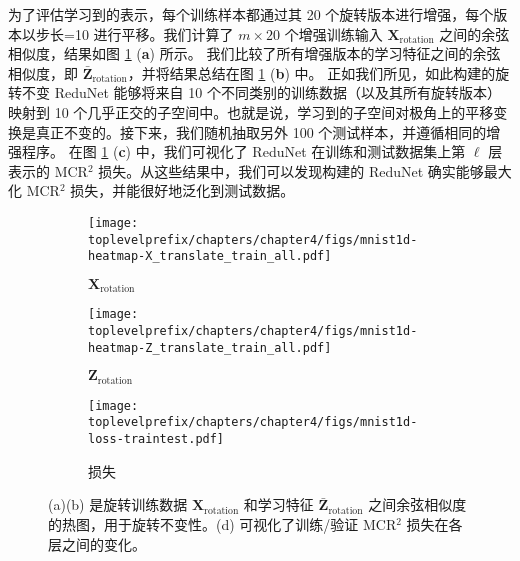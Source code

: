 \documentclass[../../book-main.tex]{subfiles}
\begin{document}
\begin{example}[数字的不变分类]
为了评估学习到的表示，每个训练样本都通过其 20 个旋转版本进行增强，每个版本以步长=10 进行平移。我们计算了 $m \times 20$ 个增强训练输入 $\bm{X}_{\text{rotation}}$ 之间的余弦相似度，结果如图 \ref{fig:redu-invariant-1d-mnist-diagram} (\textbf{a}) 所示。
我们比较了所有增强版本的学习特征之间的余弦相似度，即 $\bar{\bm{Z}}_{\text{rotation}}$，并将结果总结在图 \ref{fig:redu-invariant-1d-mnist-diagram} (\textbf{b}) 中。
正如我们所见，如此构建的旋转不变 ReduNet 能够将来自 10 个不同类别的训练数据（以及其所有旋转版本）映射到 10 个几乎正交的子空间中。也就是说，学习到的子空间对极角上的平移变换是真正不变的。接下来，我们随机抽取另外 100 个测试样本，并遵循相同的增强程序。
在图 \ref{fig:redu-invariant-1d-mnist-diagram} (\textbf{c}) 中，我们可视化了 ReduNet 在训练和测试数据集上第 $\ell$ 层表示的 MCR$^{2}$ 损失。从这些结果中，我们可以发现构建的 ReduNet 确实能够最大化 MCR$^{2}$ 损失，并能很好地泛化到测试数据。



\begin{figure}[t]
    \begin{subfigure}[t]{0.3\textwidth}
        \centering
        \texttt{[image: \\toplevelprefix/chapters/chapter4/figs/mnist1d-heatmap-X\_translate\_train\_all.pdf]}
        \caption{$\bm{X}_{\text{rotation}}$}
    \end{subfigure}
    \hfill
    \begin{subfigure}[t]{0.3\textwidth}
        \centering
        \texttt{[image: \\toplevelprefix/chapters/chapter4/figs/mnist1d-heatmap-Z\_translate\_train\_all.pdf]}
        \caption{$\bm{Z}_{\text{rotation}}$}
    \end{subfigure}
    \hfill
    \begin{subfigure}[t]{0.32\textwidth}
        \centering
        \texttt{[image: \\toplevelprefix/chapters/chapter4/figs/mnist1d-loss-traintest.pdf]}
        \caption{损失}
    \end{subfigure}
    \caption{\small (a)(b) 是旋转训练数据 $\bm{X}_{\text{rotation}}$ 和学习特征 $\bar{\bm{Z}}_{\text{rotation}}$ 之间余弦相似度的热图，用于旋转不变性。(d) 可视化了训练/验证 MCR$^2$ 损失在各层之间的变化。}
    \label{fig:redu-invariant-1d-mnist-diagram}
\end{figure}

\end{example}
\end{document}
